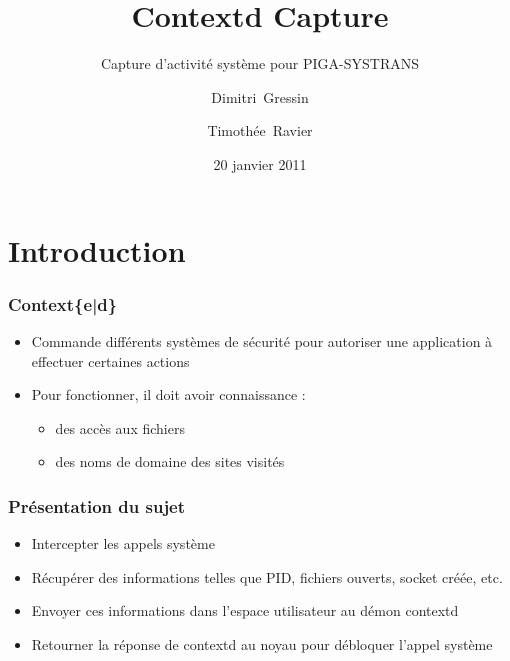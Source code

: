 \documentclass{beamer}
\title{Contextd Capture}
\subtitle{Capture d'activité système pour PIGA-SYSTRANS}
\author{Dimitri~Gressin \and Timothée~Ravier}
\institute{ENSI de Bourges}
\date{20 janvier 2011}
\begin{document}
{
	\framenumberoff
	\watermarkoff
	\begin{frame}
	\titlepage
	\end{frame}
}

\section{Introduction}
\begin{frame}
\frametitle{Context\{e|d\}}
\begin{itemize}
	\item Commande différents systèmes de sécurité pour autoriser une application à effectuer certaines actions
	\item Pour fonctionner, il doit avoir connaissance :
		\begin{itemize}
			\item des accès aux fichiers
			\item des noms de domaine des sites visités
		\end{itemize}
\end{itemize}
\end{frame}

\begin{frame}
\frametitle{Présentation du sujet}
\begin{itemize}
	\item Intercepter les appels système
	\item Récupérer des informations telles que PID, fichiers ouverts, socket créée, etc.
	\item Envoyer ces informations dans l'espace utilisateur au démon contextd
	\item Retourner la réponse de contextd au noyau pour débloquer l'appel système
\end{itemize}
\end{frame}
\end{document}
